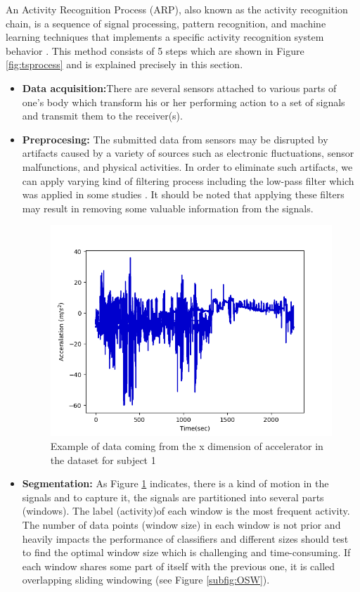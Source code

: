 An Activity Recognition Process (ARP), also known as the activity recognition chain, is a sequence of signal processing, pattern recognition, and machine learning techniques that implements a specific activity recognition system behavior \cite{bulling2014tutorial}. This method consists of 5 steps which are shown in Figure \ref{fig:tsprocess} and is explained precisely in this section.
\begin{itemize}
\item \textbf{Data acquisition:}There are several sensors attached to various parts of one's body which transform his or her performing action to a set of signals and transmit them to the receiver(s). 
\item \textbf{Preprocesing:} The submitted data from sensors may be disrupted by artifacts caused
by a variety of sources such as electronic fluctuations, sensor malfunctions, and physical activities. In order to eliminate such artifacts, we can apply varying kind of filtering process including the low-pass filter which was applied in some studies \cite{morris2014recofit}. It should be noted that applying these filters may result in removing some valuable information from the signals. 


\begin{figure}[h]
    \centering
    \includegraphics[width=.4\textwidth]{Figures/signal.png}
    \caption{Example of data coming from the x dimension of accelerator in the dataset for subject 1  }
    \label{fig:signal}
\end{figure}

\item \textbf{Segmentation:}
As Figure \ref{fig:signal} indicates, there is a kind of motion in the signals and to capture it, the signals are partitioned into several parts (windows). The label (activity)of each window is the most frequent activity. The number of data points (window size) in each window is not prior and heavily impacts the performance of classifiers \cite{bulling2014tutorial} and different sizes should test to find the optimal window size which is challenging and time-consuming. If each window shares some part of itself with the previous one, it is called overlapping sliding windowing (see Figure \ref{subfig:OSW}).  


\end{itemize}
